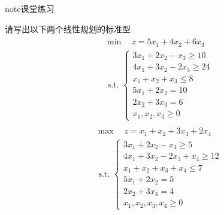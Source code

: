 \documentclass[letterpaper,10pt,english]{sphinxmanual}
\begin{document}
\begin{sphinxadmonition}{note}{课堂练习}

请写出以下两个线性规划的标准型
\begin{equation*}
\begin{split}
\begin{aligned}
&\min \quad z= 5x_{1}+ 4x_{2} + 6x_3\\
&\text { s.t. }\left\{\begin{array}{l}
{3x_{1}+2 x_{2} - x_3 \geq 10} \\
{4 x_{1}+3 x_{2} - 2x_3 \geq 24} \\
{ x_{1}+ x_{2}  + x_3 \leq 8} \\
{5x_{1}+2 x_{2}  =  10} \\
{2x_{2}+3 x_{3}  =  6} \\
{ x_{1}, x_{2},x_3 \geq 0}
\end{array}\right.
\end{aligned}
\end{split}
\end{equation*}
\(\quad\)
\begin{equation*}
\begin{split}
\begin{aligned}
&\max \quad z= x_{1}+ x_{2} + 3x_3 + 2x_4\\
&\text { s.t. }\left\{\begin{array}{l}
{3x_{1}+2 x_{2} - x_3 \geq 5} \\
{4 x_{1}+3 x_{2} - 2x_3 + x_4 \geq 12} \\
{ x_{1}+ x_{2}  + x_3 + x_4 \leq 7} \\
{5x_{1}+2 x_{2}  =  5} \\
{2x_{2}+3 x_{4}  =  4} \\
{ x_{1}, x_{2},x_3,x_4 \geq 0}
\end{array}\right.
\end{aligned}
\end{split}
\end{equation*}\end{sphinxadmonition}
\end{document}
